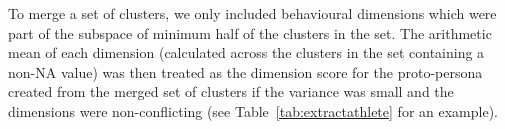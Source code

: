
To merge a set of clusters, we only included behavioural dimensions which were part of the subspace of minimum half of the clusters in the set. The arithmetic mean of each dimension (calculated across the clusters in the set containing a non-NA value) was then treated as the dimension score for the proto-persona created from the merged set of clusters if the variance was small and the dimensions were non-conflicting (see Table~\ref{tab:extractathlete} for an example).




